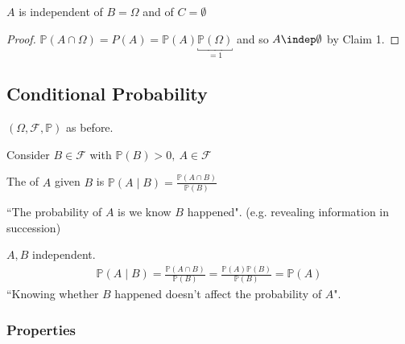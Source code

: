 \begin{claim}
    $A$ is independent of $B = \Omega$ and of $C = \emptyset$
\end{claim} 

\begin{proof}
    $\mathbb{P}(A \cap \Omega) = P(A) = \mathbb{P}(A) \underbracket{\mathbb{P}(\Omega)}_{= 1}$ and so $A \indep \emptyset$ by Claim 1.
\end{proof} 

\subsection{Conditional Probability}
$(\Omega, \mathcal{F}, \mathbb{P})$ as before.

Consider $B \in \mathcal{F}$ with $\mathbb{P}(B) > 0,\ A \in \mathcal{F}$

\begin{definition}
    The  of $A$ given $B$ is $\mathbb{P}(A \mid B) = \frac{\mathbb{P}(A \cap B)}{\mathbb{P}(B)}$
\end{definition} 
\color{blue} ``The probability of $A$ is we know $B$ happened". (e.g. revealing information in succession)

\begin{example}
    $A, B$ independent.
    \begin{align*}
        \mathbb{P}(A \mid B) = \frac{\mathbb{P}(A \cap B)}{\mathbb{P}(B)} = \frac{\mathbb{P}(A) \mathbb{P}(B)}{\mathbb{P}(B)} = \mathbb{P}(A)
    \end{align*} 
    \color{blue}``Knowing whether $B$ happened doesn't affect the probability of $A$".
\end{example} 
\color{black}

\subsubsection{Properties}

